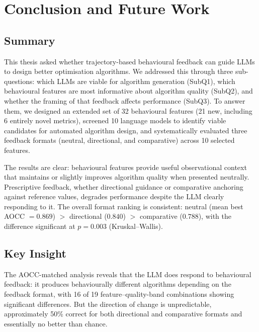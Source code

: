 
\chapter{Conclusion and Future Work}
\label{ch:conclusion}

\section{Summary}
\label{sec:conc-summary}

This thesis asked whether trajectory-based behavioural feedback can guide LLMs to design better optimisation algorithms. We addressed this through three sub-questions: which LLMs are viable for algorithm generation (SubQ1), which behavioural features are most informative about algorithm quality (SubQ2), and whether the framing of that feedback affects performance (SubQ3). To answer them, we designed an extended set of 32 behavioural features (21 new, including 6 entirely novel metrics), screened 10 language models to identify viable candidates for automated algorithm design, and systematically evaluated three feedback formats (neutral, directional, and comparative) across 10 selected features.

The results are clear: behavioural features provide useful observational context that maintains or slightly improves algorithm quality when presented neutrally. Prescriptive feedback, whether directional guidance or comparative anchoring against reference values, degrades performance despite the LLM clearly responding to it. The overall format ranking is consistent: neutral (mean best AOCC $= 0.869$) $>$ directional ($0.840$) $>$ comparative ($0.788$), with the difference significant at $p = 0.003$ (Kruskal--Wallis).

\section{Key Insight}
\label{sec:conc-insight}

The AOCC-matched analysis reveals that the LLM does respond to behavioural feedback: it produces behaviourally different algorithms depending on the feedback format, with 16 of 19 feature--quality-band combinations showing significant differences. But the direction of change is unpredictable, approximately 50\% correct for both directional and comparative formats and essentially no better than chance.

